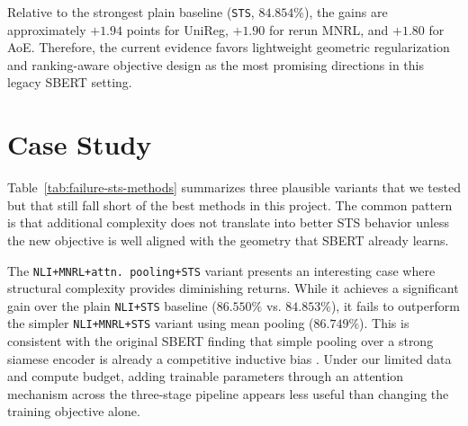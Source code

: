 \documentclass[letterpaper]{article} %
\begin{document}
Relative to the strongest plain baseline (\texttt{STS}, $84.854\%$), the gains are approximately
$+1.94$ points for UniReg, $+1.90$ for rerun MNRL, and $+1.80$ for AoE. Therefore, the current
evidence favors lightweight geometric regularization and ranking-aware objective design as the most
promising directions in this legacy SBERT setting.

\section{Case Study}

Table~\ref{tab:failure-sts-methods} summarizes three plausible variants that we tested but that still fall short of the best methods in this project. The common pattern is that additional complexity does not translate into better STS behavior unless the new objective is well aligned with the geometry that SBERT already learns.

\begin{table}[ht]
\centering
\caption{Performance of additional design variants on STSBenchmark.}
\label{tab:failure-sts-methods}
\end{table}

The \texttt{NLI+MNRL+attn. pooling+STS} variant presents an interesting case where structural complexity provides diminishing returns. While it achieves a significant gain over the plain \texttt{NLI+STS} baseline ($86.550\%$ vs. $84.853\%$), it fails to outperform the simpler \texttt{NLI+MNRL+STS} variant using mean pooling ($86.749\%$). This is consistent with the original SBERT finding that simple pooling over a strong siamese encoder is already a competitive inductive bias \cite{reimers-gurevych-2019-sentence-bert}. Under our limited data and compute budget, adding trainable parameters through an attention mechanism across the three-stage pipeline appears less useful than changing the training objective alone.
\end{document}
